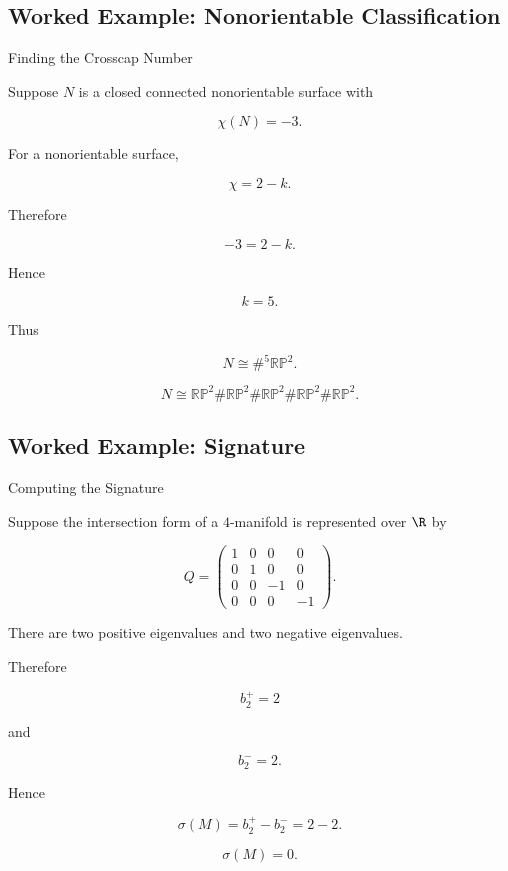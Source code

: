 \subsection{Worked Example: Nonorientable Classification}
\label{subsec:worked-nonorientable-classification}

\begin{workedexamplebox}{Finding the Crosscap Number}

Suppose \(N\) is a closed connected nonorientable surface with

\[
\chi(N)=-3.
\]

For a nonorientable surface,

\[
\chi=2-k.
\]

Therefore

\[
-3=2-k.
\]

Hence

\[
k=5.
\]

Thus

\[
N
\cong
\#^5\mathbb{RP}^2.
\]

\begin{answerbox}
\[
\boxed{
N\cong
\mathbb{RP}^2
\#
\mathbb{RP}^2
\#
\mathbb{RP}^2
\#
\mathbb{RP}^2
\#
\mathbb{RP}^2.
}
\]
\end{answerbox}
\end{workedexamplebox}

\subsection{Worked Example: Signature}
\label{subsec:worked-four-manifold-signature}

\begin{workedexamplebox}{Computing the Signature}

Suppose the intersection form of a \(4\)-manifold is represented over
\(\R\) by

\[
Q=
\begin{pmatrix}
1&0&0&0\\
0&1&0&0\\
0&0&-1&0\\
0&0&0&-1
\end{pmatrix}.
\]

There are two positive eigenvalues and two negative eigenvalues.

Therefore

\[
b_2^+=2
\]

and

\[
b_2^-=2.
\]

Hence

\[
\sigma(M)
=
b_2^+-b_2^-
=
2-2.
\]

\begin{answerbox}
\[
\boxed{
\sigma(M)=0.
}
\]
\end{answerbox}
\end{workedexamplebox}

